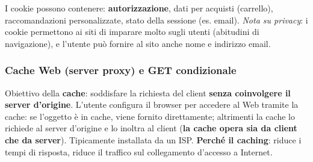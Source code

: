 \documentclass[12pt, a4paper]{article}
\begin{document}
I cookie possono contenere: \textbf{autorizzazione}, dati per acquisti (carrello), raccomandazioni personalizzate, stato della sessione (es. email). \textit{Nota su privacy}: i cookie permettono ai siti di imparare molto sugli utenti (abitudini di navigazione), e l'utente può fornire al sito anche nome e indirizzo email.

\subsubsection{Cache Web (server proxy) e GET condizionale}

Obiettivo della \textbf{cache}: soddisfare la richiesta del client \textbf{senza coinvolgere il server d'origine}. L'utente configura il browser per accedere al Web tramite la cache: se l'oggetto è in cache, viene fornito direttamente; altrimenti la cache lo richiede al server d'origine e lo inoltra al client (\textbf{la cache opera sia da client che da server}). Tipicamente installata da un ISP. \textbf{Perché il caching}: riduce i tempi di risposta, riduce il traffico sul collegamento d'accesso a Internet.
\end{document}

